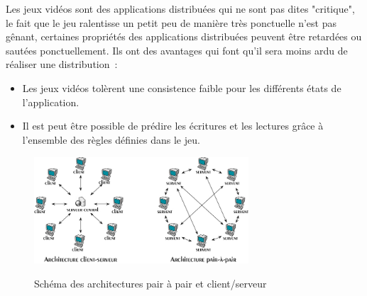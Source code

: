 	Les jeux vidéos sont des applications distribuées qui ne sont pas dites "critique", le fait que le jeu ralentisse un petit peu de manière très ponctuelle n'est pas gênant, certaines propriétés des applications distribuées peuvent être retardées ou sautées ponctuellement. Ils ont des avantages qui font qu'il sera moins ardu de réaliser une distribution~\cite{1267692}:
	\begin{itemize}
		\renewcommand{\labelitemi}{$\bullet$}
		\item Les jeux vidéos tolèrent une consistence faible pour les différents états de l'application.
		\item Il est peut être possible de prédire les écritures et les lectures grâce à l'ensemble des règles définies dans le jeu. 
	\end{itemize}
	\vspace{1cm}
	\begin{figure}[!h]
	\centering
	\includegraphics[width=8cm,height=4cm]{../Images/p2p-85145.png}\\
	\caption{Schéma des architectures pair à pair et client/serveur}
	\label{P2P/ClServ}
	\end{figure} 
\newpage
